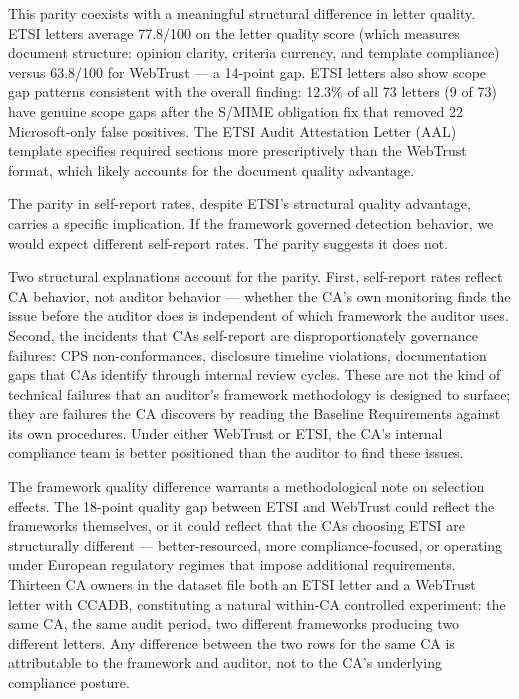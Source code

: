 \documentclass[10pt,twocolumn,letterpaper]{article}
\begin{document}
This parity coexists with a meaningful structural difference in letter
quality. ETSI letters average 77.8/100 on the letter quality score
(which measures document structure: opinion clarity, criteria currency,
and template compliance) versus 63.8/100 for WebTrust --- a 14-point
gap. ETSI letters also show scope gap patterns consistent with the overall finding: 12.3\% of all 73 letters (9 of 73) have genuine scope gaps after the S/MIME obligation fix that removed 22 Microsoft-only false positives. The ETSI Audit Attestation Letter (AAL) template
specifies required sections more prescriptively than the WebTrust format,
which likely accounts for the document quality advantage.

The parity in self-report rates, despite ETSI's structural quality
advantage, carries a specific implication. If the framework governed
detection behavior, we would expect different self-report rates.
The parity suggests it does not.

Two structural explanations account for the parity. First, self-report
rates reflect CA behavior, not auditor behavior --- whether the CA's
own monitoring finds the issue before the auditor does is independent
of which framework the auditor uses. Second, the incidents that CAs
self-report are disproportionately governance failures: CPS
non-conformances, disclosure timeline violations, documentation gaps
that CAs identify through internal review cycles. These are not the
kind of technical failures that an auditor's framework methodology
is designed to surface; they are failures the CA discovers by reading
the Baseline Requirements against its own procedures. Under either
WebTrust or ETSI, the CA's internal compliance team is better
positioned than the auditor to find these issues.

The framework quality difference warrants a methodological note on
selection effects. The 18-point quality gap between ETSI and WebTrust
could reflect the frameworks themselves, or it could reflect that
the CAs choosing ETSI are structurally different --- better-resourced,
more compliance-focused, or operating under European regulatory regimes
that impose additional requirements. Thirteen CA owners in the dataset
file both an ETSI letter and a WebTrust letter with CCADB, constituting
a natural within-CA controlled experiment: the same CA, the same audit
period, two different frameworks producing two different letters. Any
difference between the two rows for the same CA is attributable to the
framework and auditor, not to the CA's underlying compliance posture.
\end{document}
